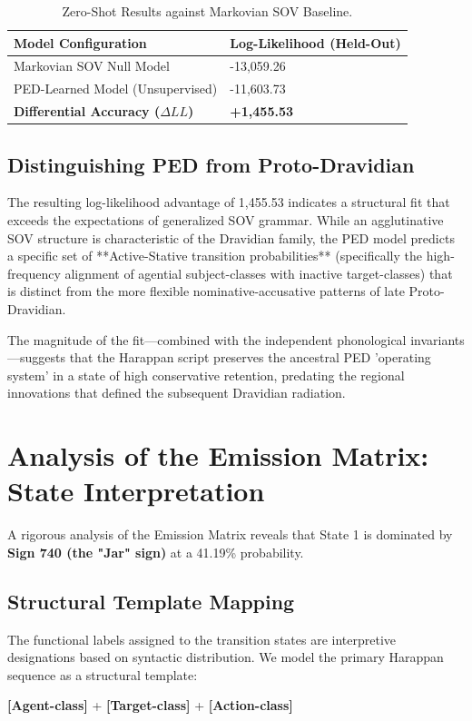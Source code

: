 \documentclass[11pt,oneside,openany]{book}
\begin{document}
\begin{table}[h]
\centering
\begin{tabular}{ll} \toprule
\textbf{Model Configuration} & \textbf{Log-Likelihood (Held-Out)} \\ \midrule
Markovian SOV Null Model & -13,059.26 \\
PED-Learned Model (Unsupervised) & -11,603.73 \\ \midrule
\textbf{Differential Accuracy ($\Delta LL$)} & \textbf{+1,455.53} \\ \bottomrule
\end{tabular}
\caption{Zero-Shot Results against Markovian SOV Baseline.}
\end{table}

\subsection{Distinguishing PED from Proto-Dravidian}
The resulting log-likelihood advantage of 1,455.53 indicates a structural fit that exceeds the expectations of generalized SOV grammar. While an agglutinative SOV structure is characteristic of the Dravidian family, the PED model predicts a specific set of **Active-Stative transition probabilities** (specifically the high-frequency alignment of agential subject-classes with inactive target-classes) that is distinct from the more flexible nominative-accusative patterns of late Proto-Dravidian. 

The magnitude of the fit—combined with the independent phonological invariants—suggests that the Harappan script preserves the ancestral PED 'operating system' in a state of high conservative retention, predating the regional innovations that defined the subsequent Dravidian radiation.

\section{Analysis of the Emission Matrix: State Interpretation}
A rigorous analysis of the Emission Matrix reveals that State 1 is dominated by \textbf{Sign 740 (the "Jar" sign)} at a 41.19\% probability. 

\subsection{Structural Template Mapping}
The functional labels assigned to the transition states are interpretive designations based on syntactic distribution. We model the primary Harappan sequence as a structural template:
\begin{center}
\textbf{[Agent-class]} + \textbf{[Target-class]} + \textbf{[Action-class]}
\end{center}
\end{document}
